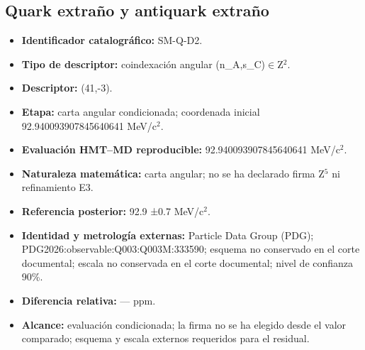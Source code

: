 \subsection{Quark extraño y antiquark extraño}
\begin{itemize}
\item \textbf{Identificador catalográfico:} SM-Q-D2.
\item \textbf{Tipo de descriptor:} coindexación angular (n\_A,s\_C)\(\in\)Z\({}^{2}\).
\item \textbf{Descriptor:} (41,-3).
\item \textbf{Etapa:} carta angular condicionada; coordenada inicial 92.940093\allowbreak{}907845\allowbreak{}640641 MeV/c\({}^{2}\).
\item \textbf{Evaluación HMT--MD reproducible:} 92.940093\allowbreak{}907845\allowbreak{}640641 MeV/c\({}^{2}\).
\item \textbf{Naturaleza matemática:} carta angular; no se ha declarado firma Z\({}^{5}\) ni refinamiento E3.
\item \textbf{Referencia posterior:} 92.9 ±\allowbreak{}0.7 MeV/c\({}^{2}\).
\item \textbf{Identidad y metrología externas:} Particle Data Group (PDG); PDG2026:\allowbreak{}observable:\allowbreak{}Q003:\allowbreak{}Q003M:\allowbreak{}333590; esquema no conservado en el corte documental; escala no conservada en el corte documental; nivel de confianza 90\%.
\item \textbf{Diferencia relativa:} --- ppm.
\item \textbf{Alcance:} evaluación condicionada; la firma no se ha elegido desde el valor comparado; esquema y escala externos requeridos para el residual.
\end{itemize}
